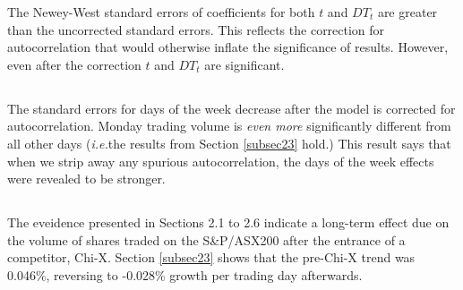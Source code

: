 \documentclass{article}\usepackage[]{graphicx}\usepackage[]{color}
\newcommand{\ie}{\textit{i.e.}}
\begin{document}
The Newey-West standard errors of coefficients for both $t$ and $DT_{t}$ are greater than the uncorrected standard errors. This reflects the correction for autocorrelation that would otherwise inflate the significance of results. However, even after the correction $t$ and $DT_{t}$ are significant. 

\newpage
\subsection{} \label{subsec26} %
The standard errors for days of the week decrease after the model is corrected for autocorrelation. Monday trading volume is \textit{even more} significantly different from all other days (\ie the results from Section \ref{subsec23} hold.) This result says that when we strip away any spurious autocorrelation, the days of the week effects were revealed to be stronger.

\subsection{} \label{subsec27} %
  The eveidence presented in Sections 2.1 to 2.6 indicate a long-term effect due on the volume of shares traded on the S\&P/ASX200 after the entrance of a competitor, Chi-X. Section \ref{subsec23} shows that the pre-Chi-X trend was 0.046\%, reversing to -0.028\% growth per trading day afterwards.
\end{document}
